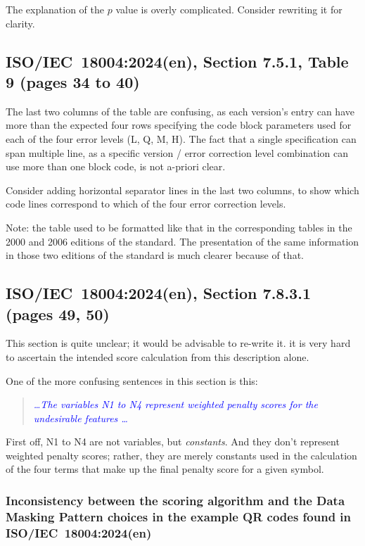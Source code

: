 \documentclass[a4paper,twoside]{article}
\newcommand{\shortstandard}{ISO/IEC~18004}
\newcommand{\standard}{\shortstandard:2024(en)}
\newcommand{\quotestandard}[1]{\textcolor{blue}{\textit{#1}}}
\newcommand{\ddd}{\dots}
\begin{document}
The explanation of the $p$ value is overly complicated. Consider rewriting it for clarity.

\subsection{\standard, Section 7.5.1, Table 9 (pages 34 to 40)}

The last two columns of the table are confusing, as each version's entry can have more than the expected
four rows specifying the code block parameters used for each of the four error levels (L, Q, M, H). The
fact that a single specification can span multiple line, as a specific version / error correction level
combination can use more than one block code, is not a-priori clear.

Consider adding horizontal separator lines in the last two columns, to show
which code lines correspond to which of the four error correction levels.

Note: the table used to be formatted like that in the corresponding tables in the 2000
and 2006 editions of the standard. The presentation of the same information in those two
editions of the standard is much clearer because of that.

\subsection{\standard, Section 7.8.3.1 (pages 49, 50)}
\label{sec:dmp-scoring}

This section is quite unclear; it would be advisable to re-write it. it is very
hard to ascertain the intended score calculation from this description alone. 

One of the more confusing sentences in this section is this:

\begin{quote}
\quotestandard{\ddd The variables N1 to N4 represent weighted penalty scores for the undesirable features \ddd}
\end{quote}

First off, N1 to N4 are not variables, but \emph{constants}. And they don't represent weighted penalty
scores; rather, they are merely constants used in the calculation of the four terms that make up
the final penalty score for a given symbol.

\subsubsection*{Inconsistency between the scoring algorithm and the Data Masking Pattern choices in the example QR codes found in \standard}
\end{document}
